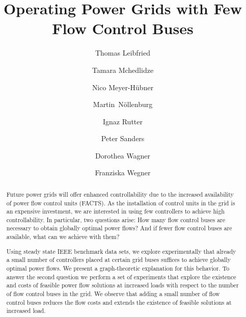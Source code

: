 \documentclass{article}[11pt,a4paper]
\begin{document}
\author[1]{Thomas Leibfried}
\author[2]{Tamara Mchedlidze}
\author[1]{Nico Meyer-H\"ubner}
\author[2]{\mbox{Martin N\"ollenburg}}
\author[2]{Ignaz Rutter}
\author[2]{Peter Sanders}
\author[2]{\authorcr Dorothea Wagner}
\author[2]{Franziska Wegner}




\title{Operating Power Grids with Few Flow Control Buses} 
\date{}
\maketitle
\begin{abstract}
Future power grids will offer enhanced controllability due to the increased availability of power flow control units (FACTS). As the installation of control units in the grid is an expensive investment, we are interested in using few controllers to achieve high controllability. In particular, two questions arise: How many flow control buses are necessary to obtain globally optimal power flows? And if fewer flow control buses are available, what can we achieve with them?

Using steady state IEEE benchmark data sets, we explore experimentally that already a small number of controllers placed at certain grid buses suffices to achieve globally optimal power flows. We present a graph-theoretic explanation for this behavior. To answer the second question we perform a set of experiments that explore the existence and costs of feasible power flow solutions at increased loads with respect to the number of flow control buses in the grid. We observe that adding a small number of flow control buses reduces the flow costs and extends the existence of feasible solutions at increased load.
\end{abstract}
\end{document}
